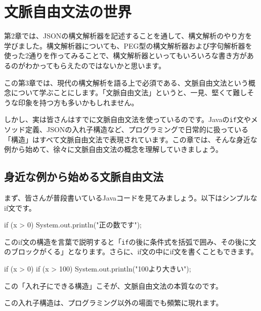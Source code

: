 \chapter{文脈自由文法の世界}\label{ch03}

第2章では、JSONの構文解析器を記述することを通して、構文解析のやり方を学びました。構文解析器についても、PEG型の構文解析器および字句解析器を使った2通りを作ってみることで、構文解析器といってもいろいろな書き方があるのがわかってもらえたのではないかと思います。

この第3章では、現代の構文解析を語る上で必須である、文脈自由文法という概念について学ぶことにします。「文脈自由文法」というと、一見、堅くて難しそうな印象を持つ方も多いかもしれません。

しかし、実は皆さんはすでに文脈自由文法を使っているのです。Javaの\texttt{if}文やメソッド定義、JSONの入れ子構造など、プログラミングで日常的に扱っている「構造」はすべて文脈自由文法で表現されています。この章では、そんな身近な例から始めて、徐々に文脈自由文法の概念を理解していきましょう。

\section{身近な例から始める文脈自由文法}

まず、皆さんが普段書いているJavaコードを見てみましょう。以下はシンプルなif文です。

\begin{codescreen}{}
if (x > 0) {
    System.out.println("正の数です");
}
\end{codescreen}

このif文の構造を言葉で説明すると「\texttt{if}の後に条件式を括弧で囲み、その後に文のブロックがくる」となります。さらに、if文の中にif文を書くこともできます。

\begin{codescreen}{}
if (x > 0) {
    if (x > 100) {
        System.out.println("100より大きい");
    }
}
\end{codescreen}

この「入れ子にできる構造」こそが、文脈自由文法の本質なのです。

この入れ子構造は、プログラミング以外の場面でも頻繁に現れます。

